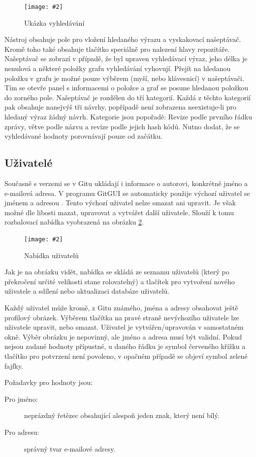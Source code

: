\documentclass[
  biblatex,
  glossaries,
  index
]{kidiplom}
\newcommand{\pic}[4]{
\begin{figure}[h]
\centering
\texttt{[image: \#2]}
\caption{#3}
\label{fig:#4}
\end{figure}}
\begin{document}
\pic{10cm}{searchbar.png}{Ukázka vyhledávání}{searchtool}

Nástroj obsahuje pole pro vložení hledaného výrazu a vyskakovací našeptávač. Kromě toho také obsahuje tlačítko speciálně pro nalezení hlavy repozitáře. Našeptávač se zobrazí v případě, že byl upraven vyhledávací výraz, jeho délka je nenulová a některé položky grafu vyhledávání vyhovují. Přejít na hledanou položku v grafu je možné pouze výběrem (myší, nebo klávesnicí) v našeptávači. Tím se otevře panel s informacemi o položce a graf se posune hledanou položkou do zorného pole. Našeptávač je rozdělen do tří kategorií. Každá z těchto kategorií pak obsahuje nanejvýš tři návrhy, popřípadě není zobrazena neexistuje-li pro hledaný výraz žádný návrh. Kategorie jsou popořadě: Revize podle prvního řádku zprávy, větve podle názvu a revize podle jejich hash kódů. Nutno dodat, že se vyhledávané hodnoty porovnávají pouze od začátku.

\subsection{Uživatelé}
Současně s verzemi se v Gitu ukládají i informace o autorovi, konkrétně jméno a e-mailová adresa. V programu GitGUI se automaticky použije výchozí uživatel se jménem  a adresou \uv{-}. Tento výchozí uživatel nelze smazat ani upravit. Je však možné dle libosti mazat, upravovat a vytvářet další uživatele. Slouží k tomu rozbalovací nabídka vyobrazená na obrázku \ref{fig:users}.

\pic{10cm}{users.png}{Nabídka uživatelů}{users}

Jak je na obrázku vidět, nabídka se skládá ze seznamu uživatelů (který po překročení určité velikosti stane rolovatelný) a tlačítek pro vytvoření nového uživatele a sdílení nebo aktualizaci databáze uživatelů.

Každý uživatel může kromě, z Gitu známého, jména a adresy obsahovat ještě profilový obrázek. Výběrem tlačítka na pravé straně nevýchozího uživatele lze uživatele upravit, nebo smazat. Uživatel je vytvářen/upravován v samostatném okně. Výběr obrázku je nepovinný, ale jméno a adresa musí být validní. Pokud nejsou zadané hodnoty přípustné, u daného řádku je symbol červeného křížku a tlačítko pro potvrzení není povoleno, v opačném případě se objeví symbol zelené fajfky.

Požadavky pro hodnoty jsou:
\begin{description}
\item[Pro jméno:] neprázdný řetězec obsahující alespoň jeden znak, který není bílý.
\item[Pro adresu:] správný tvar e-mailové adresy.
\end{description}
\end{document}
